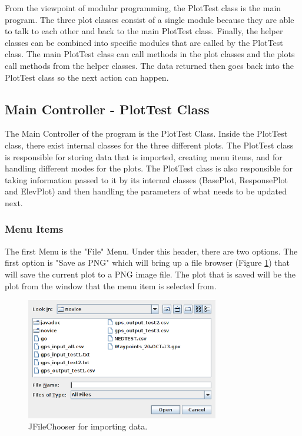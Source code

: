 \documentclass[12pt]{article}
\begin{document}
From the viewpoint of modular programming, the PlotTest class is the main program. The three plot classes consist of a single module because they are able to talk to each other and back to the main PlotTest class. Finally, the helper classes can be combined into specific modules that are called by the PlotTest class. The main PlotTest class can call methods in the plot classes and the plots call methods from the helper classes. The data returned then goes back into the PlotTest class so the next action can happen.

\subsection{Main Controller - PlotTest Class}

The Main Controller of the program is the PlotTest Class. Inside the PlotTest class, there exist internal classes for the three different plots. The PlotTest class is responsible for storing data that is imported, creating menu items, and for handling different modes for the plots. The PlotTest class is also responsible for taking information passed to it by its internal classes (BasePlot, ResponsePlot and ElevPlot) and then handling the parameters of what needs to be updated next. \\

\subsubsection{Menu Items}

The first Menu is the "File" Menu. Under this header, there are two options. The first option is "Save as PNG"  which will bring up a file browser (Figure \ref{FIG:PNG}) that will save the current plot to a PNG image file. The plot that is saved will be the plot from the window that the menu item is selected from.

\begin{figure}[h]
\centering
\includegraphics[width=0.75\textwidth]{./figs/fig0.png}
\caption{JFileChooser for importing data.}
\label{FIG:PNG}
\end{figure}
\end{document}
